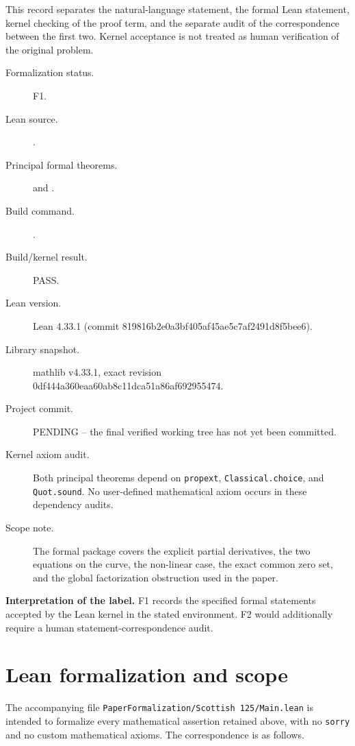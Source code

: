 \documentclass[11pt]{article}
\theoremstyle{remark}
\begin{document}
\begingroup\small\sloppy
This record separates the natural-language statement, the formal Lean statement, kernel checking of the proof term, and the separate audit of the correspondence between the first two. Kernel acceptance is not treated as human verification of the original problem.

\begin{description}
\item[Formalization status.] F1.
\item[Lean source.] \texttt{}.
\item[Principal formal theorems.] \texttt{} and \texttt{}.
\item[Build command.] \texttt{}.
\item[Build/kernel result.] PASS.
\item[Lean version.] Lean 4.33.1 (commit 819816b2e0a3bf405af45ae5c7af2491d8f5bee6).
\item[Library snapshot.] mathlib v4.33.1, exact revision 0df444a360eaa60ab8c11dca51a86af692955474.
\item[Project commit.] PENDING -- the final verified working tree has not yet been committed.
\item[Kernel axiom audit.] Both principal theorems depend on \texttt{propext}, \texttt{Classical.choice}, and \texttt{Quot.sound}. No user-defined mathematical axiom occurs in these dependency audits.
\item[Scope note.] The formal package covers the explicit partial derivatives, the two equations on the curve, the non-linear case, the exact common zero set, and the global factorization obstruction used in the paper.
\end{description}

\noindent\textbf{Interpretation of the label.} F1 records the specified formal statements accepted by the Lean kernel in the stated environment. F2 would additionally require a human statement-correspondence audit.
\endgroup

\section{Lean formalization and scope}

The accompanying file \texttt{PaperFormalization/Scottish 125/Main.lean} is intended to formalize every mathematical assertion retained above, with no \texttt{sorry} and no custom mathematical axioms.  The correspondence is as follows.
\end{document}
